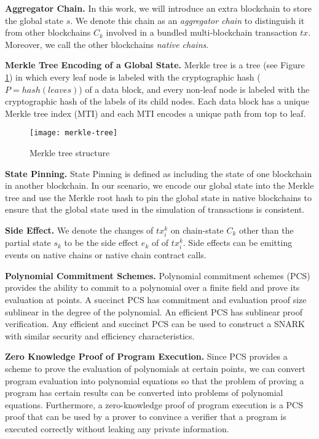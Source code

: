\smallskip\noindent\textbf{Aggregator Chain.}
In this work, we will introduce an extra blockchain to store the global state $s$. We denote this chain as an \emph{aggregator chain} to distinguish it from other blockchains $C_{k}$ involved in a bundled multi-blockchain transaction $tx$. Moreover, we call the other blockchains \emph{native chains}.

\smallskip\noindent\textbf{Merkle Tree Encoding of a Global State.}
Merkle tree \cite{becker2008merkle} is a tree (see Figure \ref{merkle-tree}) in which every leaf node is labeled with the cryptographic hash ($P = hash(leaves)$) of a data block, and every non-leaf node is labeled with the cryptographic hash of the labels of its child nodes. Each data block has a unique Merkle tree index (MTI) and each MTI encodes a unique path from top to leaf.\\

\begin{figure}[!ht]
\centerline{
\texttt{[image: merkle-tree]}}
\caption{Merkle tree structure}\label{merkle-tree}
\end{figure}

\smallskip\noindent\textbf{State Pinning.}
State Pinning \cite {robinson2019anonymous} is defined as including the state of one blockchain in another blockchain. In our scenario, we encode our global state into the Merkle tree and use the Merkle root hash to pin the global state in native blockchains to ensure that the global state used in the simulation of transactions is consistent.

\smallskip\noindent\textbf{Side Effect.}
We denote the changes of $tx_i^k$ on chain-state $C_k$ other than the partial state $s_k$ to be the side effect $e_k$ of of $tx_i^k$. Side effects can be emitting events on native chains or native chain contract calls.

\smallskip\noindent\textbf{Polynomial Commitment Schemes.}
Polynomial commitment schemes (PCS) \cite{boneh2020halo-pcs,boneh2020efficient-pcs,kate2010polynomial-pcs} provides the ability to commit to a polynomial over a finite field and prove its evaluation at points. A succinct PCS has commitment and evaluation proof size sublinear in the degree of the polynomial. An efficient PCS has sublinear proof verification. Any efficient and succinct PCS can be used to construct a SNARK \cite{mayer2016zk} with similar security and efficiency characteristics.

\smallskip\noindent\textbf{Zero Knowledge Proof of Program Execution.}
Since PCS provides a scheme to prove the evaluation of polynomials at certain points, we can convert program evaluation into polynomial equations so that the problem of proving a program has certain results can be converted into problems of polynomial equations. Furthermore, a zero-knowledge proof \cite{cramer1998zero-zkp,kate2010constant-zkp,damgaard1998commitment-zkp} of program execution is a PCS proof that can be used by a prover to convince a verifier that a program is executed correctly without leaking any private information.

